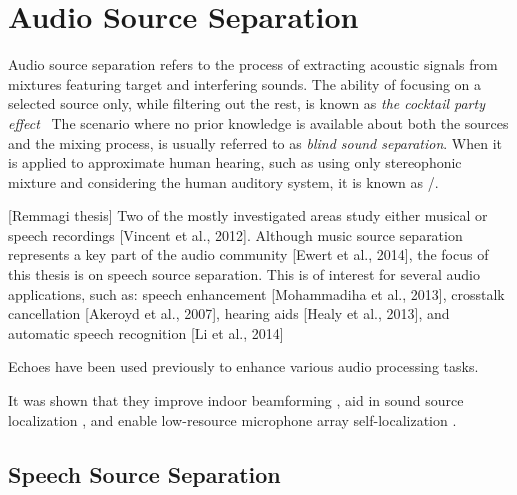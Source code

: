 \section{Audio Source Separation}
Audio source separation refers to the process of extracting acoustic signals from mixtures featuring target and interfering sounds.
The ability of focusing on a selected source only, while filtering out the rest, is known as \textit{the cocktail party effect}~
The scenario where no prior knowledge is available about both the sources and the mixing process, is usually referred to as \textit{blind sound separation}.
When it is applied to approximate human hearing, such as using only stereophonic mixture and considering the human auditory system, it is known as \CASAdef/.

[Remmagi thesis]
Two of the mostly investigated areas study either musical or speech recordings [Vincent et al., 2012].
Although music source separation represents a key part of the audio community [Ewert et al., 2014], the focus of this thesis is on speech source separation.
This is of interest for several audio applications, such as: speech enhancement [Mohammadiha et al., 2013], crosstalk cancellation [Akeroyd et al., 2007], hearing aids [Healy et al., 2013], and automatic speech recognition [Li et al., 2014]

Echoes have been used previously to enhance various audio processing tasks.

It was shown that they improve indoor beamforming ,
aid in sound source localization ,
and enable low-resource microphone array self-localization .

\subsection{Speech Source Separation}